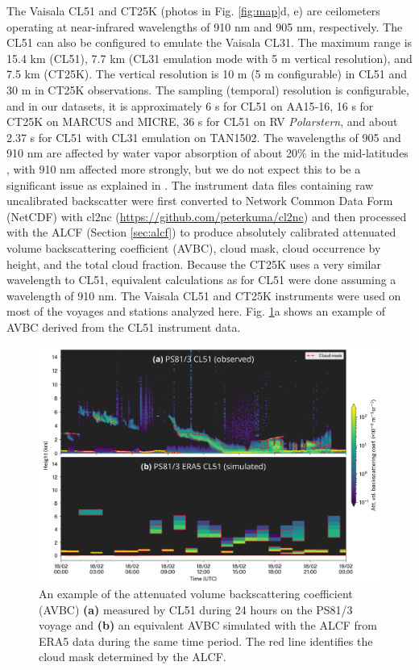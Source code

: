 \documentclass[draft]{agujournal2019}
\begin{document}
The Vaisala CL51 and CT25K (photos in Fig. \ref{fig:map}d, e) are ceilometers operating at near-infrared wavelengths of 910 nm and 905 nm, respectively. The CL51 can also be configured to emulate the Vaisala CL31. The maximum range is 15.4 km (CL51), 7.7 km (CL31 emulation mode with 5 m vertical resolution), and 7.5 km (CT25K). The vertical resolution is 10 m (5 m configurable) in CL51 and 30 m in CT25K observations. The sampling (temporal) resolution is configurable, and in our datasets, it is approximately 6 s for CL51 on AA15‐16, 16 s for CT25K on MARCUS and MICRE, 36 s for CL51 on RV \emph{Polarstern}, and about 2.37 s for CL51 with CL31 emulation on TAN1502. The wavelengths of 905 and 910 nm are affected by water vapor absorption of about 20\% in the mid-latitudes , with 910 nm affected more strongly, but we do not expect this to be a significant issue as explained in . The instrument data files containing raw uncalibrated backscatter were first converted to Network Common Data Form (NetCDF) with cl2nc (\url{https://github.com/peterkuma/cl2nc}) and then processed with the ALCF (Section \ref{sec:alcf}) to produce absolutely calibrated attenuated volume backscattering coefficient (AVBC), cloud mask, cloud occurrence by height, and the total cloud fraction. Because the CT25K uses a very similar wavelength to CL51, equivalent calculations as for CL51 were done assuming a wavelength of 910 nm. The Vaisala CL51 and CT25K instruments were used on most of the voyages and stations analyzed here. Fig. \ref{fig:example}a shows an example of AVBC derived from the CL51 instrument data.

\begin{figure}[b!]
\centering
\includegraphics[width=\textwidth]{img/example.png}
\caption{
An example of the attenuated volume backscattering coefficient (AVBC) \textbf{(a)} measured by CL51 during 24 hours on the PS81/3 voyage and \textbf{(b)} an equivalent AVBC simulated with the ALCF from ERA5 data during the same time period. The red line identifies the cloud mask determined by the ALCF.
}
\label{fig:example}
\end{figure}
\end{document}
